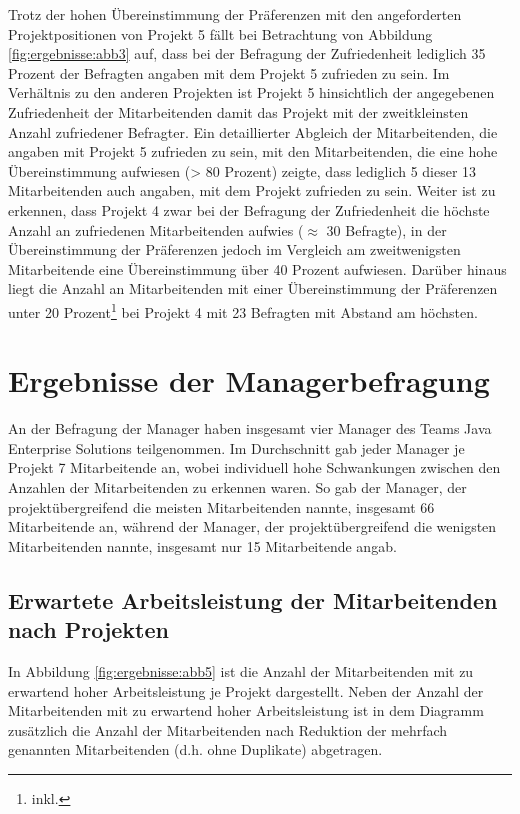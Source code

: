 Trotz der hohen Übereinstimmung der Präferenzen mit den angeforderten Projektpositionen von Projekt 5 fällt bei Betrachtung von Abbildung \ref{fig:ergebnisse:abb3} auf, dass bei der Befragung der Zufriedenheit lediglich 35 Prozent der Befragten angaben mit dem Projekt 5 zufrieden zu sein.
Im Verhältnis zu den anderen Projekten ist Projekt 5 hinsichtlich der angegebenen Zufriedenheit der Mitarbeitenden damit das Projekt mit der zweitkleinsten Anzahl zufriedener Befragter.
Ein detaillierter Abgleich der Mitarbeitenden, die angaben mit Projekt 5 zufrieden zu sein, mit den Mitarbeitenden, die eine hohe Übereinstimmung aufwiesen (> 80 Prozent) zeigte, dass lediglich 5 dieser 13 Mitarbeitenden auch angaben, mit dem Projekt zufrieden zu sein.
Weiter ist zu erkennen, dass Projekt 4 zwar bei der Befragung der Zufriedenheit die höchste Anzahl an zufriedenen Mitarbeitenden aufwies ($\approx$ 30 Befragte), in der Übereinstimmung der Präferenzen jedoch im Vergleich am zweitwenigsten Mitarbeitende eine Übereinstimmung über 40 Prozent aufwiesen.
Darüber hinaus liegt die Anzahl an Mitarbeitenden mit einer Übereinstimmung der Präferenzen unter 20 Prozent\footnote{inkl.} bei Projekt 4 mit 23 Befragten mit Abstand am höchsten.

\section{Ergebnisse der Managerbefragung}
An der Befragung der Manager haben insgesamt vier Manager des Teams Java Enterprise Solutions teilgenommen.
Im Durchschnitt gab jeder Manager je Projekt 7 Mitarbeitende an, wobei individuell hohe Schwankungen zwischen den Anzahlen der Mitarbeitenden zu erkennen waren.
So gab der Manager, der projektübergreifend die meisten Mitarbeitenden nannte, insgesamt 66 Mitarbeitende an, während der Manager, der projektübergreifend die wenigsten Mitarbeitenden nannte, insgesamt nur 15 Mitarbeitende angab.

\subsection{Erwartete Arbeitsleistung der Mitarbeitenden nach Projekten}
In Abbildung \ref{fig:ergebnisse:abb5} ist die Anzahl der Mitarbeitenden mit zu erwartend hoher Arbeitsleistung je Projekt dargestellt.
Neben der Anzahl der Mitarbeitenden mit zu erwartend hoher Arbeitsleistung ist in dem Diagramm zusätzlich die Anzahl der Mitarbeitenden nach Reduktion der mehrfach genannten Mitarbeitenden (d.h. ohne Duplikate) abgetragen.

